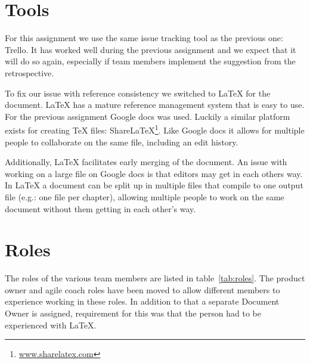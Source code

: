 
\section{Tools}
For this assignment we use the same issue tracking tool as the previous one: Trello. It has worked well during the previous assignment and we expect that it will do so again, especially if team members implement the suggestion from the retrospective.

To fix our issue with reference consistency we switched to LaTeX for the document. LaTeX has a mature reference management system that is easy to use.
For the previous assignment Google docs was used. Luckily a similar platform exists for creating TeX files: ShareLaTeX\footnote{\url{www.sharelatex.com}}.
Like Google docs it allows for multiple people to collaborate on the same file, including an edit history.

Additionally, LaTeX facilitates early merging of the document. 
An issue with working on a large file on Google docs is that editors may get in each others way.
In LaTeX a document can be split up in multiple files that compile to one output file (e.g.: one file per chapter), allowing multiple people to work on the same document without them getting in each other's way.

\section{Roles}
The roles of the various team members are listed in table~\ref{tab:roles}.
The product owner and agile coach roles have been moved to allow different members to experience working in these roles.
In addition to that a separate Document Owner is assigned, requirement for this was that the person had to be experienced with LaTeX. 

